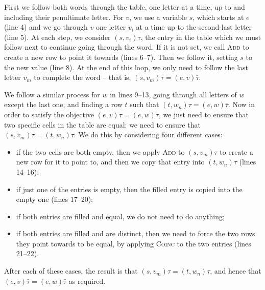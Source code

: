 First we follow both words through the table, one letter at a time, up to and
including their penultimate letter.  For $v$, we use a variable $s$, which
starts at $e$ (line 4) and we go through $v$ one letter $v_i$ at a time up to
the second-last letter (line 5).  At each step, we consider $(s, v_i)\tau$, the
entry in the table which we must follow next to continue going through the
word.  If it is not set, we call \textsc{Add} to create a new row to point it
towards (lines 6--7).  Then we follow it, setting $s$ to the new value (line
8).  At the end of this loop, we only need to follow the last letter $v_m$ to
complete the word -- that is, $(s, v_m)\tau = (e, v)\bar\tau$.

We follow a similar process for $w$ in lines 9--13, going through all letters of
$w$ except the last one, and finding a row $t$ such that
$(t, w_n)\tau = (e, w)\bar\tau$.  Now in order to satisfy the objective
$(e,v)\bar\tau = (e,w)\bar\tau$, we just need to ensure that two specific cells
in the table are equal: we need to ensure that $(s, v_m)\tau = (t, w_n)\tau$.
We do this by considering four different cases:
\begin{itemize}
\item if the two cells are both empty, then we apply \textsc{Add} to
  $(s, v_m)\tau$ to create a new row for it to point to, and then we copy that
  entry into $(t, w_n)\tau$ (lines 14--16);
\item if just one of the entries is empty, then the filled entry is copied into
  the empty one (lines 17--20);
\item if both entries are filled and equal, we do not need to do anything;
\item if both entries are filled and are distinct, then we need to force the two
  rows they point towards to be equal, by applying \textsc{Coinc} to the two
  entries (lines 21--22).
\end{itemize}
After each of these cases, the result is that $(s, v_m)\tau = (t, w_n)\tau$, and
hence that $(e, v)\bar\tau = (e, w)\bar\tau$ as required.

